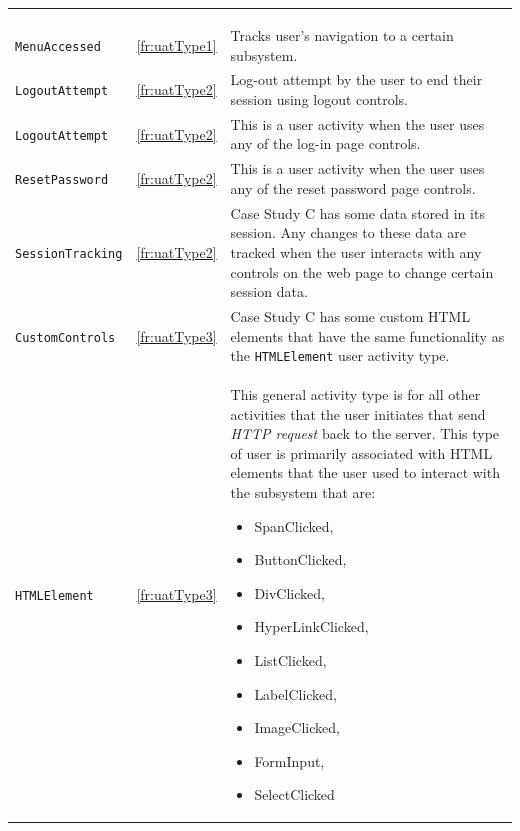 \begin{xltabular}{\textwidth}{llX}
	\caption[Case Study A activity types]{\textit{Case Study A activity types}}\label{tbl:ch3_systemCActivityTypes}\\
	\toprule
	 &  &  \\
	\midrule
	\endfirsthead

	\caption[]{\continueCaption} \\
	\toprule
	 &  &  \\
	\midrule
	\endhead

	\midrule
	 \\ 
	\endfoot
	\endlastfoot

	\texttt{MenuAccessed} & \ref{fr:uatType1} & \RaggedRight Tracks user's navigation to a certain subsystem. \\ 
	\texttt{LogoutAttempt} & \ref{fr:uatType2} & \RaggedRight Log-out attempt by the user to end their session using logout controls. \\ 
	\texttt{LogoutAttempt} & \ref{fr:uatType2} & \RaggedRight This is a user activity when the user uses any of the log-in page controls. \\
	\texttt{ResetPassword} & \ref{fr:uatType2} & \RaggedRight This is a user activity when the user uses any of the reset password page controls. \\
	\texttt{SessionTracking} & \ref{fr:uatType2} & \RaggedRight Case Study C has some data stored in its session. Any changes to these data are tracked when the user interacts with any controls on the web page to change certain session data. \\
	\texttt{CustomControls} & \ref{fr:uatType3} & \RaggedRight Case Study C has some custom HTML elements that have the same functionality as the \texttt{HTMLElement} user activity type. \\ 
	\texttt{HTMLElement} & \ref{fr:uatType3} & \RaggedRight This general activity type is for all other activities that the user initiates that send \textit{HTTP request} back to the server. This type of user is primarily associated with HTML elements that the user used to interact with the subsystem that are: \begin{itemize}
		\item SpanClicked,
		\item ButtonClicked, 
		\item DivClicked, 
		\item HyperLinkClicked,
		\item ListClicked, 
		\item LabelClicked, 
		\item ImageClicked, 
		\item FormInput, 
		\item SelectClicked
	\end{itemize} \\
	\bottomrule
\end{xltabular}

